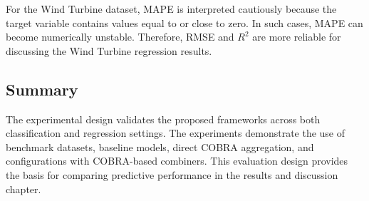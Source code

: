 For the Wind Turbine dataset, MAPE is interpreted cautiously because the target variable contains values equal to or close to zero. In such cases, MAPE can become numerically unstable. Therefore, RMSE and $R^2$ are more reliable for discussing the Wind Turbine regression results.

\subsection{Summary}

\hs The experimental design validates the proposed frameworks across both classification and regression settings. The experiments demonstrate the use of benchmark datasets, baseline models, direct COBRA aggregation, and \KFCProcedure{} configurations with COBRA-based combiners. This evaluation design provides the basis for comparing predictive performance in the results and discussion chapter.



